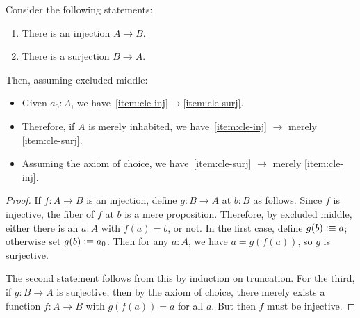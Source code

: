 \documentclass[10pt,a4paper]{article}
\providecommand{\index}[1]{}
\newcommand{\defeq}{\vcentcolon\equiv}  %
\theoremstyle{definition}
\theoremstyle{remark}
\numberwithin{equation}{section}
\begin{document}
\begin{lem}\label{thm:injsurj}
  \index{function!injective}%
  \index{function!surjective}%
  Consider the following statements:
  \begin{enumerate}
  \item There is an injection $A\to B$.\label{item:cle-inj}
  \item There is a surjection $B\to A$.\label{item:cle-surj}
  \end{enumerate}
  Then, assuming excluded middle:
  \index{excluded middle}%
  \index{axiom!of choice}%
  \begin{itemize}
  \item Given $a_0:A$, we have~\ref{item:cle-inj}$\to$\ref{item:cle-surj}.
  \item Therefore, if $A$ is merely inhabited, we have~\ref{item:cle-inj} $\to$ merely \ref{item:cle-surj}.
  \item Assuming the axiom of choice, we have~\ref{item:cle-surj} $\to$ merely \ref{item:cle-inj}.
  \end{itemize}
\end{lem}

\begin{proof}
  If $f:A\to B$ is an injection, define $g:B\to A$ at $b:B$ as follows.
  Since $f$ is injective, the fiber of $f$ at $b$ is a mere proposition.
  Therefore, by excluded middle, either there is an $a:A$ with $f(a)=b$, or not.
  In the first case, define $g(b)\defeq a$; otherwise set $g(b)\defeq a_0$.
  Then for any $a:A$, we have $a = g(f(a))$, so $g$ is surjective.

  The second statement follows from this by induction on truncation.
  For the third, if $g:B\to A$ is surjective, then by the axiom of choice, there merely exists a function $f:A\to B$ with $g(f(a)) = a$ for all $a$.
  But then $f$ must be injective.
\end{proof}
\end{document}
